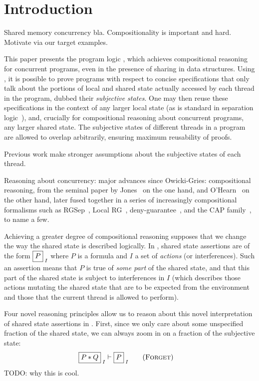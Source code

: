 \section{Introduction}

Shared memory concurrency bla.  Compositionality is important and
hard. Motivate via our target examples.

This paper presents the program logic \colosl, which achieves
compositional reasoning for concurrent programs, even in the presence
of sharing in data structures.  Using \colosl, it is possible to prove
programs with respect to concise specifications that only talk about
the portions of local and shared state actually accessed by each
thread in the program, dubbed their \emph{subjective states}.  One may
then reuse these specifications in the context of any larger local
state (as is standard in separation logic~\cite{rey02}), and,
crucially for compositional reasoning about concurrent programs, any
larger shared state. The subjective states of different threads in a
program are allowed to overlap arbitrarily, ensuring maximum
reusability of proofs.

Previous work make stronger assumptions about the subjective states of
each thread.

Reasoning about concurrency: major advances since Owicki-Gries:
compositional reasoning, from the seminal paper by Jones~\cite{rg} on
the one hand, and O'Hearn~\cite{csl-orig,csl-tcs} on the other hand,
later fused together in a series of increasingly compositional
formalisms such as RGSep~\cite{viktor-marriage}, Local RG~\cite{lrg},
deny-guarantee~\cite{dg}, and the CAP
family~\cite{cap-ecoop10,icap,tada}, to name a few.


Achieving a greater degree of compositional reasoning supposes that we
change the way the shared state is described logically.  In \colosl,
shared state assertions are of the form $\shared P I$ where $P$ is a
formula and $I$ a set of \emph{actions} (or interferences). Such an
assertion means that $P$ is true of \emph{some part} of the shared
state, and that this part of the shared state is subject to
interferences in $I$ (which describes those actions mutating the
shared state that are to be expected from the environment and those
that the current thread is allowed to perform).

Four novel reasoning principles allow us to reason about this novel
interpretation of shared state assertions in \colosl. First, since we
only care about some unspecified fraction of the shared state, we can
always  zoom in on a fraction of the subjective state:
\begin{align*}
  \shared{P * Q}{I} &\vdash \shared{P}{I}  \tag{\textsc{Forget}}
\end{align*}
TODO: why this is cool.

